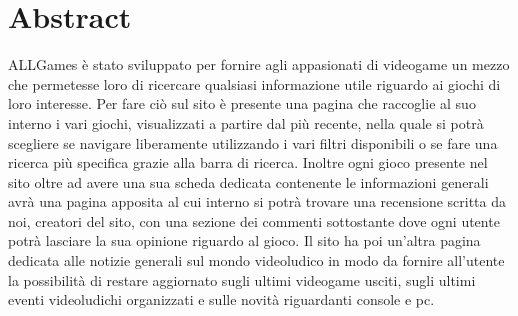 \section*{Abstract}

ALLGames è stato sviluppato per fornire agli appasionati di videogame un mezzo che permetesse loro di ricercare qualsiasi informazione utile riguardo ai giochi di loro interesse.
Per fare ciò sul sito è presente una pagina che raccoglie al suo interno i vari giochi, visualizzati a partire dal più recente, nella quale si potrà scegliere se navigare liberamente utilizzando i vari filtri disponibili o se fare una ricerca più specifica grazie alla barra di ricerca.
Inoltre ogni gioco presente nel sito oltre ad avere una sua scheda dedicata contenente le informazioni generali avrà una pagina apposita al cui interno si potrà trovare una recensione scritta da noi, creatori del sito, con una sezione dei commenti sottostante dove ogni utente potrà lasciare la sua opinione riguardo al gioco.
Il sito ha poi un'altra pagina dedicata alle notizie generali sul mondo videoludico in modo da fornire all'utente la possibilità di restare aggiornato sugli ultimi videogame usciti, sugli ultimi eventi videoludichi organizzati e sulle novità riguardanti console e pc.